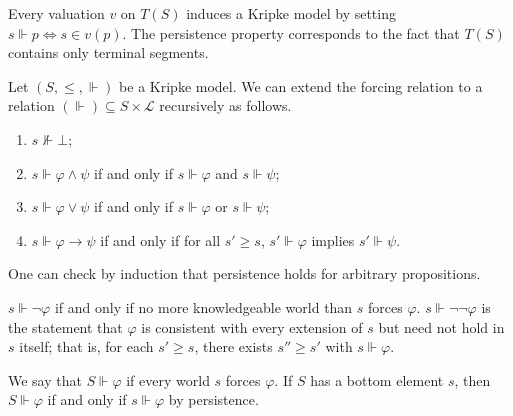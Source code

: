Every valuation \( v \) on \( T(S) \) induces a Kripke model by setting \( s \Vdash p \iff s \in v(p) \).
The persistence property corresponds to the fact that \( T(S) \) contains only terminal segments.
\begin{definition}
    Let \( (S, \leq, \Vdash) \) be a Kripke model.
    We can extend the forcing relation to a relation \( (\Vdash) \subseteq S \times \mathcal L \) recursively as follows.
    \begin{enumerate}
        \item \( s \nVdash \bot \);
        \item \( s \Vdash \varphi \wedge \psi \) if and only if \( s \Vdash \varphi \) and \( s \Vdash \psi \);
        \item \( s \Vdash \varphi \vee \psi \) if and only if \( s \Vdash \varphi \) or \( s \Vdash \psi \);
        \item \( s \Vdash \varphi \to \psi \) if and only if for all \( s' \geq s \), \( s' \Vdash \varphi \) implies \( s' \Vdash \psi \).
    \end{enumerate}
\end{definition}
One can check by induction that persistence holds for arbitrary propositions.
\begin{remark}
    \( s \Vdash \neg\varphi \) if and only if no more knowledgeable world than \( s \) forces \( \varphi \).
    \( s \Vdash \neg\neg\varphi \) is the statement that \( \varphi \) is consistent with every extension of \( s \) but need not hold in \( s \) itself; that is, for each \( s' \geq s \), there exists \( s'' \geq s' \) with \( s \Vdash \varphi \).
\end{remark}
We say that \( S \Vdash \varphi \) if every world \( s \) forces \( \varphi \).
If \( S \) has a bottom element \( s \), then \( S \Vdash \varphi \) if and only if \( s \Vdash \varphi \) by persistence.
